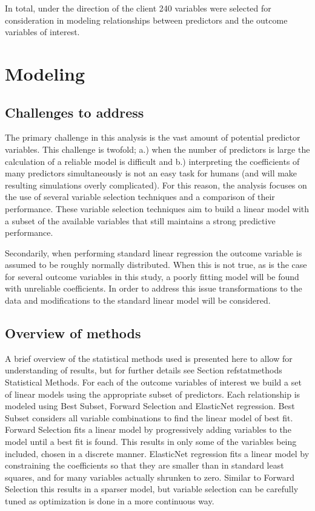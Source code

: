\documentclass{article}
\begin{document}
In total, under the direction of the client 240 variables were selected for consideration in modeling 
relationships between predictors and the outcome variables of interest.


\section{Modeling}
\subsection{Challenges to address}

The primary challenge in this analysis is the vast amount of potential predictor variables. This challenge is twofold; a.) when 
the number of predictors is large the calculation of a reliable model is difficult and b.) interpreting the coefficients of many 
predictors simultaneously is not an easy task for humans (and will make resulting simulations overly complicated). For this 
reason, the analysis focuses on the use of several variable selection techniques and a comparison of their performance. 
These variable selection techniques aim to build a linear model with a subset of the available variables that still maintains 
a strong predictive performance.

Secondarily, when performing standard linear regression the outcome variable is assumed to be roughly normally 
distributed. When this is not true, as is the case for several outcome variables in this study, a poorly fitting model will be 
found with unreliable coefficients. In order to address this issue transformations to the data and modifications to the 
standard linear model will be considered.

\subsection{Overview of methods}

A brief overview of the statistical methods used is presented here to allow for understanding of results, 
but for further details see Section refstatmethods Statistical Methods. For each of the outcome variables of interest 
we build a set of linear models using the appropriate subset of predictors. Each relationship is modeled 
using Best Subset, Forward Selection and ElasticNet regression. Best Subset considers all variable combinations to find the 
linear model of best fit. Forward Selection fits a linear model by progressively adding variables to the model until a best fit is 
found. This results in only some of the variables being included, chosen in a discrete manner. ElasticNet regression fits a linear 
model by constraining the coefficients so that they are smaller than in standard least squares, and for many variables actually 
shrunken to zero. Similar to Forward Selection this results in a sparser model, but variable selection can be carefully tuned 
as optimization is done in a more continuous way.
\end{document}
